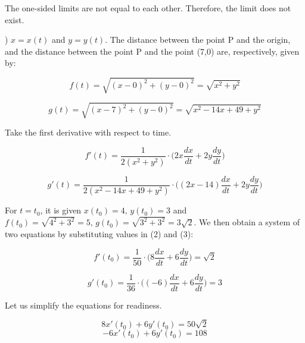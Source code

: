 \documentclass{article}
\begin{document}
\hfill

\noindent The one-sided limits are not equal to each other. Therefore, the limit does not exist.

\hfill

) $x=x(t)$ and $y=y(t)$. The distance between the point P and the origin, and the distance between the point P and the point (7,0) are, respectively, given by:

\begin{equation*}f(t) = \sqrt{(x-0)^2 + (y-0)^2} = \sqrt{x^2+y^2}\end{equation*}

\begin{equation*}g(t) = \sqrt{(x-7)^2 + (y-0)^2} = \sqrt{x^2-14x +49+y^2}\end{equation*}

\hfill

\noindent Take the first derivative with respect to time.

\begin{equation}f'(t) =\frac{1}{2(x^2+y^2)}\cdot\Big(2x\frac{dx}{dt} + 2y\frac{dy}{dt}\Big)\end{equation}

\begin{equation}g'(t) =\frac{1}{2(x^2-14x +49+y^2)}\cdot\Big((2x-14)\frac{dx}{dt} + 2y\frac{dy}{dt}\Big)\end{equation}

\hfill

\noindent For $t=t_0$, it is given $x(t_0) = 4,\,y(t_0) = 3$ and $f(t_0) = \sqrt{4^2 +3^2} = 5,\,g(t_0) = \sqrt{3^2 + 3^2} = 3\sqrt{2}$. We then obtain a system of two equations by substituting values in (2) and (3):

\begin{equation*}f'(t_0) =\frac{1}{50}\cdot\Big(8\frac{dx}{dt}+6\frac{dy}{dt}\Big) = \sqrt{2} \end{equation*}

\begin{equation*}g'(t_0) =\frac{1}{36}\cdot\Big((-6)\frac{dx}{dt} + 6\frac{dy}{dt}\Big) = 3\end{equation*}

\hfill

\noindent Let us simplify the equations for readiness.

\begin{equation*}8x'(t_0)+6y'(t_0) = 50\sqrt{2} \end{equation*}
\begin{equation*}-6x'(t_0)+6y'(t_0) = 108 \end{equation*}
\end{document}
